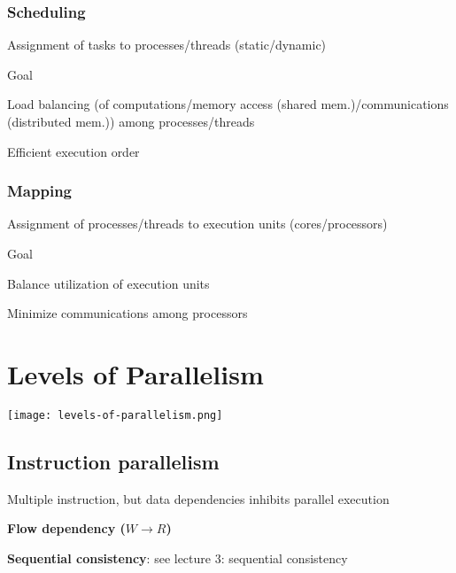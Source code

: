 \documentclass[12pt]{article}
\begin{document}
\begin{spacing}{1.5}
\subsubsection{Scheduling}

\begin{itemize*}
	\item Assignment of tasks to processes/threads (static/dynamic)
	\item Goal 
		\begin{itemize*}
			\item Load balancing (of computations/memory access (shared mem.)/communications (distributed mem.)) among processes/threads
			\item Efficient execution order
		\end{itemize*}
\end{itemize*}	


\subsubsection{Mapping}

\begin{itemize*}
	\item Assignment of processes/threads to execution units (cores/processors)
	\item Goal 
		\begin{itemize*}
			\item Balance utilization of execution units
			\item Minimize communications among processors
		\end{itemize*}
\end{itemize*}	

\section{Levels of Parallelism}

\texttt{[image: levels-of-parallelism.png]}

\subsection{Instruction parallelism}

Multiple instruction, but data dependencies inhibits parallel execution

\begin{itemize*}
	\item \textbf{Flow dependency ($W \rightarrow R$)}
	\item \textbf{Sequential consistency}: see lecture 3: sequential consistency
\end{itemize*}


\end{spacing}
\end{document}
